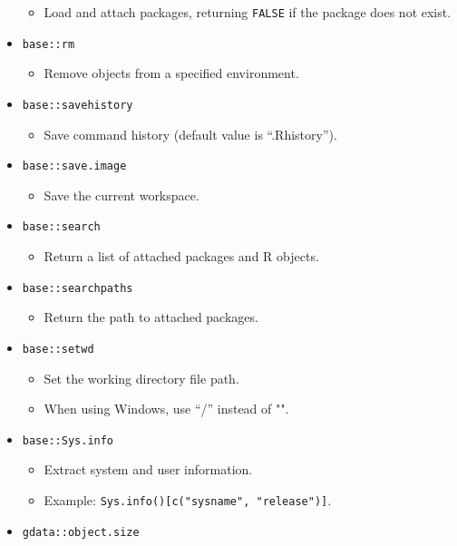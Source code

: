 \documentclass[
]{book}
\providecommand{\tightlist}{%
  \setlength{\itemsep}{0pt}\setlength{\parskip}{0pt}}
\begin{document}
\begin{itemize}
  \begin{itemize}
  \tightlist
  \item
    Load and attach packages, returning \texttt{FALSE} if the package does not exist.
  \end{itemize}
\item
  \texttt{base::rm}

  \begin{itemize}
  \tightlist
  \item
    Remove objects from a specified environment.
  \end{itemize}
\item
  \texttt{base::savehistory}

  \begin{itemize}
  \tightlist
  \item
    Save command history (default value is ``.Rhistory'').
  \end{itemize}
\item
  \texttt{base::save.image}

  \begin{itemize}
  \tightlist
  \item
    Save the current workspace.
  \end{itemize}
\item
  \texttt{base::search}

  \begin{itemize}
  \tightlist
  \item
    Return a list of attached packages and R objects.
  \end{itemize}
\item
  \texttt{base::searchpaths}

  \begin{itemize}
  \tightlist
  \item
    Return the path to attached packages.
  \end{itemize}
\item
  \texttt{base::setwd}

  \begin{itemize}
  \tightlist
  \item
    Set the working directory file path.
  \item
    When using Windows, use ``/'' instead of "".
  \end{itemize}
\item
  \texttt{base::Sys.info}

  \begin{itemize}
  \tightlist
  \item
    Extract system and user information.
  \item
    Example: \texttt{Sys.info(){[}c("sysname",\ "release"){]}}.
  \end{itemize}
\item
  \texttt{gdata::object.size}


\end{itemize}
\end{document}
